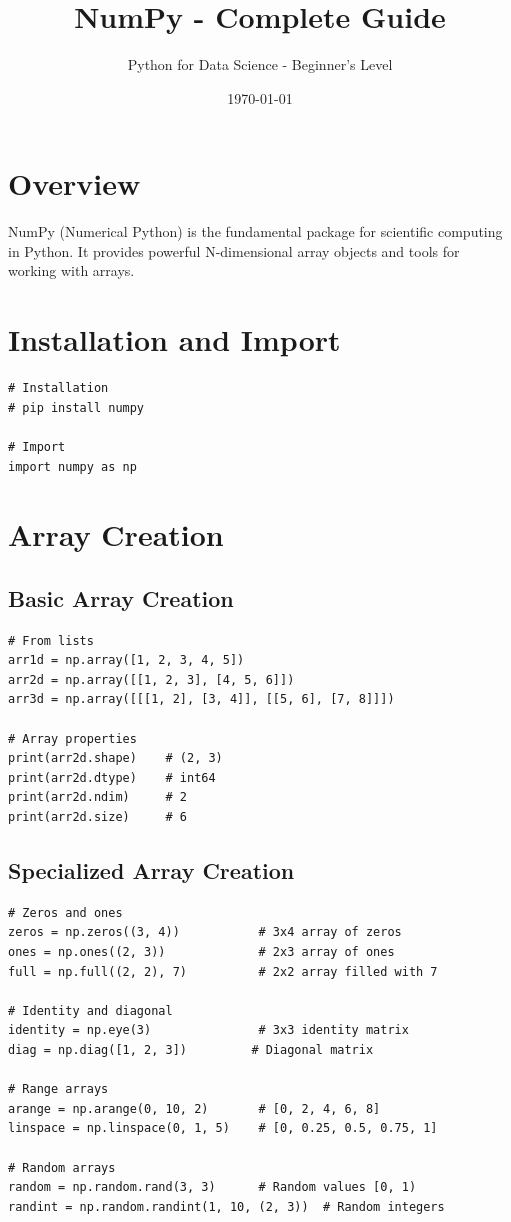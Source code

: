\documentclass[12pt,a4paper]{article}
\title{\textbf{NumPy - Complete Guide}}
\author{Python for Data Science - Beginner's Level}
\date{\today}
\begin{document}
\maketitle
\tableofcontents
\newpage

\section{Overview}

NumPy (Numerical Python) is the fundamental package for scientific computing in Python. It provides powerful N-dimensional array objects and tools for working with arrays.

\section{Installation and Import}

\begin{lstlisting}
# Installation
# pip install numpy

# Import
import numpy as np
\end{lstlisting}

\section{Array Creation}

\subsection{Basic Array Creation}

\begin{lstlisting}
# From lists
arr1d = np.array([1, 2, 3, 4, 5])
arr2d = np.array([[1, 2, 3], [4, 5, 6]])
arr3d = np.array([[[1, 2], [3, 4]], [[5, 6], [7, 8]]])

# Array properties
print(arr2d.shape)    # (2, 3)
print(arr2d.dtype)    # int64
print(arr2d.ndim)     # 2
print(arr2d.size)     # 6
\end{lstlisting}

\subsection{Specialized Array Creation}

\begin{lstlisting}
# Zeros and ones
zeros = np.zeros((3, 4))           # 3x4 array of zeros
ones = np.ones((2, 3))             # 2x3 array of ones
full = np.full((2, 2), 7)          # 2x2 array filled with 7

# Identity and diagonal
identity = np.eye(3)               # 3x3 identity matrix
diag = np.diag([1, 2, 3])         # Diagonal matrix

# Range arrays
arange = np.arange(0, 10, 2)       # [0, 2, 4, 6, 8]
linspace = np.linspace(0, 1, 5)    # [0, 0.25, 0.5, 0.75, 1]

# Random arrays
random = np.random.rand(3, 3)      # Random values [0, 1)
randint = np.random.randint(1, 10, (2, 3))  # Random integers
\end{lstlisting}
\end{document}
